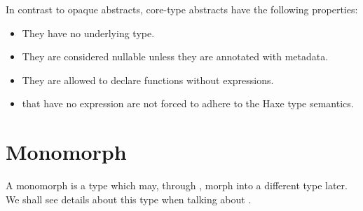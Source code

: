 In contrast to opaque abstracts, core-type abstracts have the following properties:

\begin{itemize}
	\item They have no underlying type.
	\item They are considered nullable unless they are annotated with  metadata.
	\item They are allowed to declare  functions without expressions.
	\item {} that have no expression are not forced to adhere to the Haxe type semantics.
\end{itemize}



\section{Monomorph}
\label{types-monomorph}

A monomorph is a type which may, through , morph into a different type later. We shall see details about this type when talking about .

